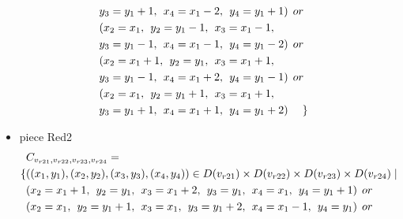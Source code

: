 \begin{appendices}
\begin{itemize}
\begin{align*}
\\&y_{3} = y_{1}+1,\hspace{1ex}x_{4} = x_{1}-2,\hspace{1ex}y_{4} = y_{1}+1)\hspace{1ex} or\\
&(x_{2} = x_{1},\hspace{1ex}y_{2} = y_{1}-1,\hspace{1ex}x_{3} = x_{1}-1, 
\\&y_{3} = y_{1}-1,\hspace{1ex}x_{4} = x_{1}-1,\hspace{1ex}y_{4} = y_{1}-2)\hspace{1ex} or\\
&(x_{2} = x_{1}+1,\hspace{1ex}y_{2} = y_{1},\hspace{1ex}x_{3} = x_{1}+1, 
\\&y_{3} = y_{1}-1,\hspace{1ex}x_{4} = x_{1}+2,\hspace{1ex}y_{4} = y_{1}-1)\hspace{1ex} or\\
&(x_{2} = x_{1},\hspace{1ex}y_{2} = y_{1}+1,\hspace{1ex}x_{3} = x_{1}+1, 
\\&y_{3} = y_{1}+1,\hspace{1ex}x_{4} = x_{1}+1,\hspace{1ex}y_{4} = y_{1}+2)\hspace{3ex} \} 
\end{align*}
\item piece Red2\\
\begin{align*}
&\Const{r21}{r22}{r23}{r24}=
\\\{&((x_{1},y_{1}),(x_{2},y_{2}),(x_{3},y_{3}),(x_{4},y_{4}))\in \Domain{r21}\times \Domain{r22}\times\Domain{r23}\times\Domain{r24}\mid\\
&(x_{2} = x_{1} + 1,\hspace{1ex}y_{2} = y_{1},\hspace{1ex}x_{3} = x_{1} + 2, \hspace{1ex}y_{3} = y_{1},\hspace{1ex}x_{4} = x_{1},\hspace{1ex}y_{4} = y_{1}+1)\hspace{1ex} or\\
&(x_{2} = x_{1},\hspace{1ex}y_{2} = y_{1}+1,\hspace{1ex}x_{3} = x_{1}, \hspace{1ex}y_{3} = y_{1}+2,\hspace{1ex}x_{4} = x_{1}-1,\hspace{1ex}y_{4} = y_{1})\hspace{1ex} or\\

\end{align*}
\end{itemize}
\end{appendices}
